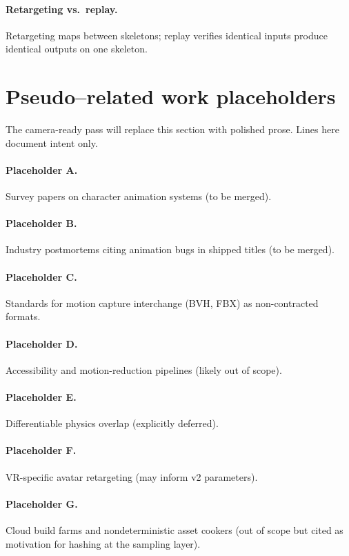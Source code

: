 \documentclass[sigconf,nonacm]{acmart}
\begin{document}
\paragraph{Retargeting vs.\ replay.}
Retargeting maps between skeletons; replay verifies identical inputs produce
identical outputs on one skeleton.

\section{Pseudo--related work placeholders}
\label{app:place}

The camera-ready pass will replace this section with polished prose. Lines
here document intent only.

\paragraph{Placeholder A.}
Survey papers on character animation systems (to be merged).

\paragraph{Placeholder B.}
Industry postmortems citing animation bugs in shipped titles (to be merged).

\paragraph{Placeholder C.}
Standards for motion capture interchange (BVH, FBX) as non-contracted formats.

\paragraph{Placeholder D.}
Accessibility and motion-reduction pipelines (likely out of scope).

\paragraph{Placeholder E.}
 Differentiable physics overlap (explicitly deferred).

\paragraph{Placeholder F.}
VR-specific avatar retargeting (may inform v2 parameters).

\paragraph{Placeholder G.}
Cloud build farms and nondeterministic asset cookers (out of scope but cited
as motivation for hashing at the sampling layer).
\end{document}
